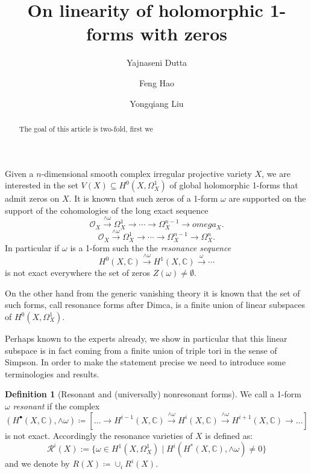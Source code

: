 \documentclass[11pt,reqno]{amsart}
\title{}
\theoremstyle{definition}
\newtheorem{definition}[theorem]{Definition}
\theoremstyle{remark}
\theoremstyle{cited}
\theoremstyle{citeddef}
\newcommand{\C}{\mathbb{C}}
\newcommand{\sO}{\mathcal{O}}
\newcommand{\sR}{\mathcal{R}}
\newcommand{\bbC}{\mathbb{C}}
\begin{document}
  
\title[On linearity of holomorphic 1-forms with zeros]{On linearity of holomorphic 1-forms with zeros} 

\author{Yajnaseni Dutta}


\author{Feng Hao}


\author{Yongqiang Liu}






\begin{abstract} 
The goal of this article is two-fold, first we 
\end{abstract}

\maketitle


Given a $n$-dimensional smooth complex irregular projective variety $X$, we are interested in the set $V(X)\subseteq H^0(X, \Omega_X^1)$ of global holomorphic 1-forms
that admit zeros on $X$. It is known that such zeros of a 1-form $\omega$ 
are supported on the support of the cohomologies of the long exact sequence
\[\sO_X\overset{\wedge\omega}{\to} \Omega_X^1 \to \cdots\to \Omega_X^{n-1}\to omega_X.\]
\[\sO_X\overset{\wedge\omega}{\to} \Omega_X^1 \to \cdots\to \Omega_X^{n-1}\to \Omega^n_X.\]
In particular if $\omega$ is a 1-form such the the \textit{resonance sequence}
\[H^0(X,\bbC)\overset{\wedge\omega}{\to}H^1(X,\bbC)\overset{\omega}{\to}\cdots\]
is not exact everywhere the set of zeros $Z(\omega)\neq \emptyset$.

On the other hand from the generic vanishing theory it is known that the set of such forms, call resonance forms after Dimca,
is a finite union of linear subspaces of $H^0(X,\Omega_X^1)$.

Perhaps known to the experts already, we show in particular that this linear subspace is in fact coming from a 
finite union of triple
tori in the sense of Simpson. In order to make the statement precise we need to introduce some terminologies and results. 
\begin{definition}[Resonant and (universally) nonresonant forms]\label{def:resonance}
We call a 1-form $\omega$ \emph{resonant} if the complex 
\[(H^{\bullet}(X,\bbC), \wedge\omega)\coloneqq [\ldots\to H^{i-1}(X,\C)\overset{\wedge\omega}{\longrightarrow}H^{i}(X,\C)\overset{\wedge\omega}{\longrightarrow}H^{i+1}(X,\C)\to\ldots]\]
 is not exact. Accordingly the resonance varieties of $X$ is defined as:
$$ \sR^i(X):= \{\omega\in H^1(X,\Omega_X^1)\mid  H^i  (H^*(X,\bbC), \wedge \omega) \neq 0 \} $$
and we denote by $R(X) \coloneqq \cup_i R^i(X)$.
\end{definition}
\end{document}
